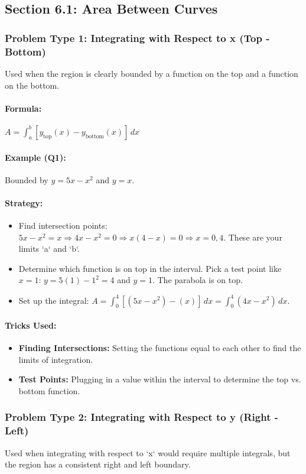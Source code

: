 \documentclass{article}
\begin{document}
\subsection{Section 6.1: Area Between Curves}
\subsubsection{Problem Type 1: Integrating with Respect to x (Top - Bottom)}
Used when the region is clearly bounded by a function on the top and a function on the bottom.
\paragraph{Formula:} $ A = \int_a^b [y_{\text{top}}(x) - y_{\text{bottom}}(x)] \,dx $
\paragraph{Example (Q1):} Bounded by $y=5x-x^2$ and $y=x$.
\paragraph{Strategy:}
\begin{itemize}
    \item Find intersection points: $5x-x^2 = x \Rightarrow 4x-x^2=0 \Rightarrow x(4-x)=0 \Rightarrow x=0, 4$. These are your limits `a` and `b`.
    \item Determine which function is on top in the interval. Pick a test point like $x=1$: $y=5(1)-1^2=4$ and $y=1$. The parabola is on top.
    \item Set up the integral: $A = \int_0^4 [(5x-x^2) - (x)] \,dx = \int_0^4 (4x-x^2) \,dx$.
\end{itemize}
\paragraph{Tricks Used:}
\begin{itemize}
    \item \textbf{Finding Intersections:} Setting the functions equal to each other to find the limits of integration.
    \item \textbf{Test Points:} Plugging in a value within the interval to determine the top vs. bottom function.
\end{itemize}

\subsubsection{Problem Type 2: Integrating with Respect to y (Right - Left)}
Used when integrating with respect to `x` would require multiple integrals, but the region has a consistent right and left boundary.
\end{document}

